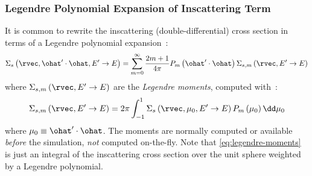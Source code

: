 \begin{frame}
        \frametitle{Legendre Polynomial Expansion of Inscattering Term}
        It is common to rewrite the inscattering (double-differential) cross section in terms of a Legendre polynomial expansion~\cite{Larsen2010}:
        \begin{equation}
                \label{eq:scattering-poly-expansion}
                \Sigma_s \left(\rvec,\ohat'\cdot \ohat,E'\rightarrow E\right) = \sum_{m=0}^{\infty}\frac{2m+1}{4\pi}P_m \left(\ohat' \cdot \ohat \right)\Sigma_{s,m}\left(\rvec, E'\rightarrow E\right)
        \end{equation}
        where $\Sigma_{s,m}\left(\rvec, E'\rightarrow E\right)$ are the \textit{Legendre moments}, computed with~\cite{TheoryManualOpenSn}:
        \begin{equation} \label{eq:legendre-moments}
                \Sigma_{s,m}\left(\rvec, E'\rightarrow E\right) = 2\pi \int_{-1}^{1}\Sigma_s \left(\rvec,\mu_0,E'\rightarrow E\right)P_m \left(\mu_0\right)\dd \mu_0
        \end{equation}
        where $\mu_0 \equiv \ohat' \cdot \ohat$.
        The moments are normally computed or available \textit{before} the simulation, \textit{not} computed on-the-fly.
        Note that \cref{eq:legendre-moments} is just an integral of the inscattering cross section over the unit sphere weighted by a Legendre polynomial.
\end{frame}
